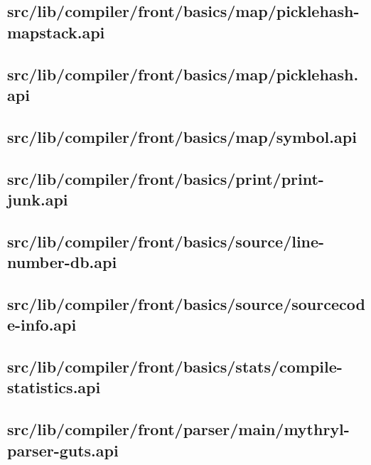 \subsection{src/lib/compiler/front/basics/map/picklehash-mapstack.api}


\subsection{src/lib/compiler/front/basics/map/picklehash.api}


\subsection{src/lib/compiler/front/basics/map/symbol.api}


\subsection{src/lib/compiler/front/basics/print/print-junk.api}


\subsection{src/lib/compiler/front/basics/source/line-number-db.api}


\subsection{src/lib/compiler/front/basics/source/sourcecode-info.api}


\subsection{src/lib/compiler/front/basics/stats/compile-statistics.api}


\subsection{src/lib/compiler/front/parser/main/mythryl-parser-guts.api}



